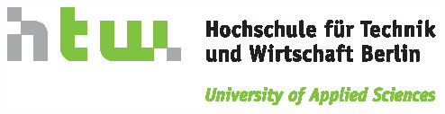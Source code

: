 \thispagestyle{empty}
\begin{flushright}
    \vspace*{-2cm}
    \includegraphics[scale=1]{general/HTW_Logo_quer_4c.eps}\\
    \vspace{2cm}
\end{flushright}
